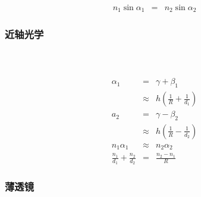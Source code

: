 \documentclass{beamer}
\begin{document}
{{{{\begin{frame}
  \begin{eqnarray*}
    n_1 \sin \alpha_1 & = & n_2 \sin \alpha_2
  \end{eqnarray*}
\end{frame}}{\begin{frame}
  \frametitle{近轴光学}
  
  \
  
\end{frame}}{\begin{frame}
  \frametitle{}
  
  
  \begin{eqnarray*}
    \alpha_1 & = & \gamma + \beta_1\\
    & \approx & h \left( \frac{1}{R} + \frac{1}{d_1} \right)\\
    a_2 & = & \gamma - \beta_2\\
    & \approx & h \left( \frac{1}{R} - \frac{1}{d_2} \right)\\
    n_1 \alpha_1 & \approx & n_2 \alpha_2\\
    \frac{n_1}{d_1} + \frac{n_2}{d_2} & = & \frac{n_2 - n_1}{R}
  \end{eqnarray*}
  
\end{frame}}{\begin{frame}
  \frametitle{薄透镜}
  

\end{frame}}}}}
\end{document}
